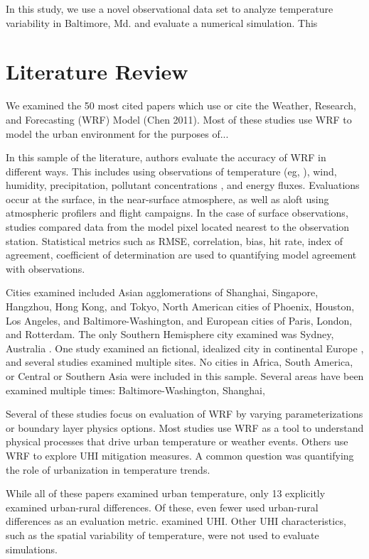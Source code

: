 \documentclass[draft,linenumbers]{agujournal}
\begin{document}
In this study, we use a novel observational data set to analyze temperature variability in Baltimore, Md. and evaluate a numerical simulation. This 

\section{Literature Review}

We examined the 50 most cited papers which use or cite the Weather, Research, and Forecasting (WRF) Model (Chen 2011). Most of these studies use WRF to model the urban environment for the purposes of... 

In this sample of the literature, authors evaluate the accuracy of WRF in different ways. This includes using observations of temperature (eg, \citet{}), wind, humidity, precipitation, pollutant concentrations \citep{}, and energy fluxes. Evaluations occur at the surface, in the near-surface atmosphere, as well as aloft using atmospheric profilers and flight campaigns. In the case of surface observations, studies compared data from the model pixel located nearest to the observation station. Statistical metrics such as RMSE, correlation, bias, hit rate, index of agreement, coefficient of determination are used to quantifying model agreement with observations.  

Cities examined included Asian agglomerations of Shanghai, Singapore, Hangzhou, Hong Kong, and Tokyo, North American cities of Phoenix, Houston, Los Angeles, and Baltimore-Washington, and European cities of Paris, London, and Rotterdam. The only Southern Hemisphere city examined was Sydney, Australia \cite{argueso2014temperature}. One study examined an fictional, idealized city in continental Europe \citep{theeuwes2014seasonal}, and several studies examined multiple sites. No cities in Africa, South America, or Central or Southern Asia were included in this sample.  Several areas have been examined multiple times: Baltimore-Washington, Shanghai, 

Several of these studies focus on evaluation of WRF by varying parameterizations or boundary layer physics options. Most studies use WRF as a tool to understand physical processes that drive urban temperature or weather events. Others use WRF to explore UHI mitigation measures. A common question was quantifying the role of urbanization in temperature trends.

While all of these papers examined urban temperature, only 13 explicitly examined urban-rural differences. Of these, even fewer used urban-rural differences as an evaluation metric. \citet{li2013synergistic} examined UHI. 
Other UHI characteristics, such as the spatial variability of temperature, were not used to evaluate simulations. 
\end{document}
